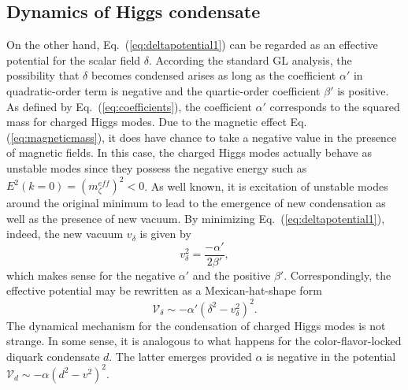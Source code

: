 \documentclass[12pt]{article}
\begin{document}
\subsection{Dynamics of Higgs condensate}

On the other hand, Eq.~(\ref{eq:deltapotential1}) can be regarded as an effective potential for the scalar field $\delta$. 
According the standard GL analysis, the possibility that $\delta$ becomes condensed arises as long as the coefficient $\alpha'$ in quadratic-order term is negative and the quartic-order coefficient $\beta'$ is positive. 
As defined by Eq.~(\ref{eq:coefficients}), the coefficient $\alpha'$ corresponds to 
the squared mass for charged Higgs modes.
Due to the magnetic effect Eq.(\ref{eq:magneticmass}), it does have chance to take a negative value in the presence of magnetic fields.
In this case, the charged Higgs modes actually behave as unstable modes since they possess the negative energy such as $E^2(k=0)=(m_\zeta^{eff})^2<0$.
As well known, it is excitation of unstable modes around the original minimum to lead to the emergence of new condensation as well as the presence of new vacuum.
By minimizing Eq.~(\ref{eq:deltapotential1}), indeed, the new vacuum $v_\delta$ is given by
\begin{equation}
\label{eq:vacuumexpectation}
v_\delta^2 = \frac{- \alpha'} {2\beta'},
\end{equation}
which makes sense for the negative $\alpha'$ and the positive $\beta'$. 
Correspondingly, the effective potential may be rewritten as a Mexican-hat-shape form
\begin{equation}
\label{eq:deltapotential}
\mathcal{V}_\delta \sim - \alpha'(\delta^2 - v_\delta^2)^2.
\end{equation}
The dynamical mechanism for the condensation of charged Higgs modes is not strange. 
In some sense, it is analogous to what happens for the color-flavor-locked diquark condensate $d$. The latter emerges provided $\alpha$ is negative in the potential $\mathcal{V}_d \sim - \alpha (d^2 - v^2)^2$.
\end{document}
